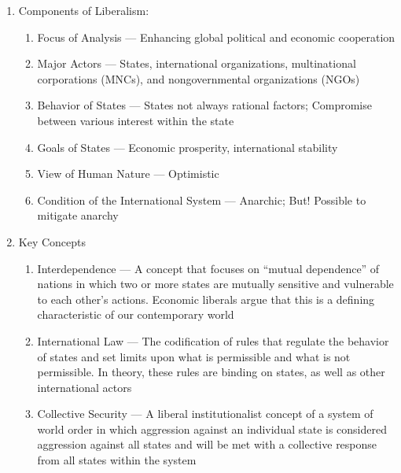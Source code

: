 \documentclass[12pt]{article}
\begin{document}
\begin{enumerate}
      \item Components of Liberalism:

        \begin{enumerate}

          \item Focus of Analysis — Enhancing global political and economic cooperation

          \item Major Actors — States, international organizations, multinational corporations (MNCs), and nongovernmental organizations (NGOs)

          \item Behavior of States — States not always rational factors; Compromise between various interest within the state

          \item Goals of States — Economic prosperity, international stability

          \item View of Human Nature — Optimistic

          \item Condition of the International System — Anarchic; But! Possible to mitigate anarchy

        \end{enumerate}

      \item Key Concepts

        \begin{enumerate}

          \item Interdependence — A concept that focuses on “mutual dependence” of nations in which two or more states are mutually sensitive and vulnerable to each other's actions. Economic liberals argue that this is a defining characteristic of our contemporary world

          \item International Law — The codification of rules that regulate the behavior of states and set limits upon what is permissible and what is not permissible. In theory, these rules are binding on states, as well as other international actors

          \item Collective Security — A liberal institutionalist concept of a system of world order in which aggression against an individual state is considered aggression against all states and will be met with a collective response from all states within the system


\end{enumerate}
\end{enumerate}
\end{document}
